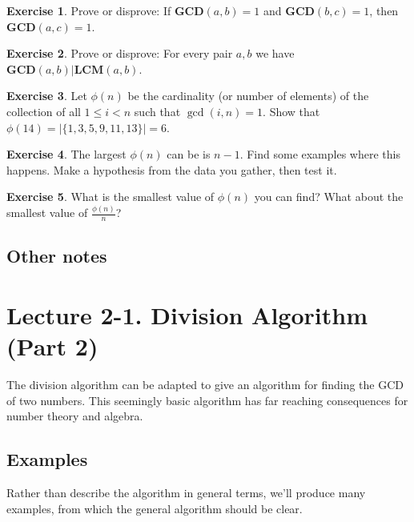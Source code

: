 \documentclass[11pt]{article}
\theoremstyle{definition}
\newtheorem{exercise}{Exercise}
\numberwithin{thm}{section}
\begin{document}
\begin{exercise} Prove or disprove: If $\textbf{GCD}(a,b) = 1$ and $\textbf{GCD}(b,c) = 1$, then $\textbf{GCD}(a,c) = 1$.
\end{exercise}

\begin{exercise} Prove or disprove: For every pair $a,b$ we have $\textbf{GCD}(a,b) | \textbf{LCM}(a,b)$.
\end{exercise}

\begin{exercise} Let $\phi(n)$ be the cardinality (or number of elements) of the collection of all $1 \leq i < n$ such that $\gcd(i,n) = 1$. Show that $\phi(14) = |\{1,3,5,9,11,13\}| = 6$.
\end{exercise}

\begin{exercise} The largest $\phi(n)$ can be is $n-1$. Find some examples where this happens. Make a hypothesis from the data you gather, then test it.
\end{exercise}

\begin{exercise} What is the smallest value of $\phi(n)$ you can find? What about the smallest value of $\frac{\phi(n)}{n}$?
\end{exercise}


\subsection{Other notes}



\newpage
\section{Lecture 2-1. Division Algorithm (Part 2)}

The division algorithm can be adapted to give an algorithm for finding the GCD of two numbers. This seemingly basic algorithm has far reaching consequences for number theory and algebra.

\subsection{Examples}

Rather than describe the algorithm in general terms, we'll produce many examples, from which the general algorithm should be clear.
\end{document}
